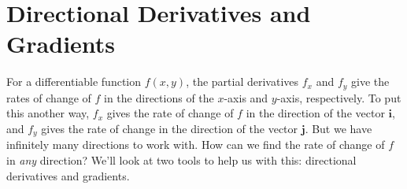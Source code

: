 \documentclass[10pt,]{book}
\numberwithin{equation}{section}
\newcommand{\vv}[1]{\mathbf{#1}}
\begin{document}
\section[{Directional Derivatives and Gradients}]{Directional Derivatives and Gradients}\label{section-directional-derivatives-and-gradients}
\hypertarget{p-1395}{}%
For a differentiable function \(f(x,y)\), the partial derivatives \(f_{x}\) and \(f_{y}\) give the rates of change of \(f\) in the directions of the \(x\)-axis and \(y\)-axis, respectively. To put this another way, \(f_{x}\) gives the rate of change of \(f\) in the direction of the vector \(\vv{i}\), and \(f_{y}\) gives the rate of change in the direction of the vector \(\vv{j}\). But we have infinitely many directions to work with. How can we find the rate of change of \(f\) in \emph{any} direction? We'll look at two tools to help us with this: directional derivatives and gradients.%
%
%
\typeout{************************************************}
\typeout{************************************************}
%
\end{document}
